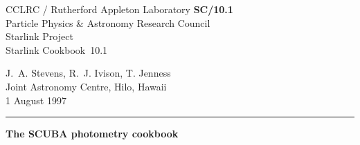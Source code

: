 \documentclass[twoside,11pt,fleqn]{article}
\newcommand{\stardoccategory}  {Starlink Cookbook}
\newcommand{\stardocinitials}  {SC}
\newcommand{\stardocnumber}    {10.1}
\newcommand{\stardocauthors}   {J.~A. Stevens, R.~J. Ivison, T. Jenness\\
                                Joint Astronomy Centre, Hilo, Hawaii}
\newcommand{\stardocdate}      {1 August 1997}
\newcommand{\stardoctitle}     {The SCUBA photometry cookbook}
\newcommand{\stardocversion}   {\ }
\newcommand{\stardocmanual}    {\ }
\newcommand{\stardocname}{\stardocinitials /\stardocnumber}
\newenvironment{latexonly}{}{}
\begin{document}
\thispagestyle{empty}
 
\begin{latexonly}
   CCLRC / {\sc Rutherford Appleton Laboratory} \hfill {\bf \stardocname}\\
   {\large Particle Physics \& Astronomy Research Council}\\
   {\large Starlink Project\\}
   {\large \stardoccategory\ \stardocnumber}
   \begin{flushright}
   \stardocauthors\\
   \stardocdate
   \end{flushright}
   \vspace{-4mm}
   \rule{\textwidth}{0.5mm}
   \vspace{5mm}
   \begin{center}

   {\Huge\bf  \stardoctitle \\ [2.5ex]}
   {\LARGE\bf \stardocversion \\ [4ex]}
   {\Huge\bf  \stardocmanual}
   \end{center}
   \vspace{5mm}
 
\end{latexonly}
 
\end{document}
